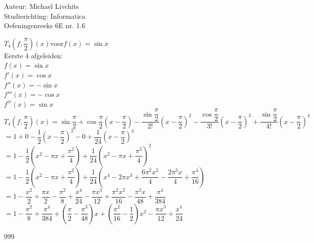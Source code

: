 \documentclass[a4paper]{article}
\begin{document}
  
\noindent \large Auteur: Michael Livchits \\
\noindent \large Studierichting: Informatica\\
\noindent \large Oefeningenreeks 6E nr. 1.6\\

\medskip

\normalsize

$T_4\left(f,\dfrac{\pi}{2}\right)(x)$voor$f(x) = \sin x$\\

Eerste 4 afgeleiden:\\

$f(x) = \sin x$\\

$f'(x) = \cos x$\\

$f''(x) = -\sin x$\\

$f'''(x) = -\cos x$\\

$f^{iv}(x) = \sin x$\\

$T_4\left(f,\dfrac{\pi}{2}\right)(x) = \sin \dfrac{\pi}{2} + \cos \dfrac{\pi}{2} \left(x-\dfrac{\pi}{2}\right) - \dfrac{\sin\dfrac{\pi}{2}}{2!}\left(x-\dfrac{\pi}{2}\right)^2 - \dfrac{\cos\dfrac{\pi}{2}}{3!}\left(x-\dfrac{\pi}{2}\right)^3 + \dfrac{\sin\dfrac{\pi}{2}}{4!}\left(x-\dfrac{\pi}{2}\right)^4$\\

$= 1 + 0 - \dfrac{1}{2}\left(x-\dfrac{\pi}{2}\right)^2 - 0 + \dfrac{1}{24}\left(x-\dfrac{\pi}{2}\right)^4$\\

$= 1 - \dfrac{1}{2}\left(x^2-\pi x +\dfrac{\pi^2}{4}\right) + \dfrac{1}{24}\left(x^2-\pi x +\dfrac{\pi^2}{4}\right)^2$\\

$= 1 - \dfrac{1}{2}\left(x^2-\pi x +\dfrac{\pi^2}{4}\right) + \dfrac{1}{24}\left(x^4-2\pi x^3+\dfrac{6\pi^2x^2}{4}-\dfrac{2\pi^3x}{4}+\dfrac{\pi^4}{16}\right)$\\

$= 1 -\dfrac{x^2}{2} + \dfrac{\pi x}{2} - \dfrac{\pi^2}{8} + \dfrac{x^4}{24} - \dfrac{\pi x^3}{12} +\dfrac{\pi^2x^2}{16} - \dfrac{\pi^3x}{48} + \dfrac{\pi^4}{384}$\\

$= 1 - \dfrac{\pi^2}{8} + \dfrac{\pi^4}{384} + \left(\dfrac{\pi}{2} - \dfrac{\pi^3}{48}\right)x + \left(\dfrac{\pi^2}{16} - \dfrac{1}{2}\right)x^2 - \dfrac{\pi x^3}{12} + \dfrac{x^4}{24}$\\

\begin{thebibliography}{999}
\end{thebibliography}
\end{document}
